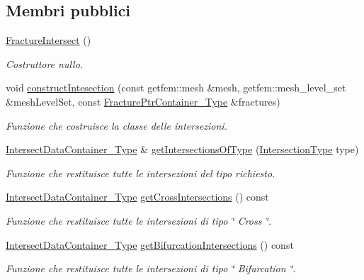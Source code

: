 \subsection*{Membri pubblici}
\begin{DoxyCompactItemize}
\item 
\hyperlink{classFractureIntersect_a2416c29105bde5cbf9032b04db47ba31}{Fracture\-Intersect} ()
\begin{DoxyCompactList}\small\item\em Costruttore nullo. \end{DoxyCompactList}\item 
void \hyperlink{classFractureIntersect_a776675c1805c35046d26a5f2bf6b1f34}{construct\-Intesection} (const getfem\-::mesh \&mesh, getfem\-::mesh\-\_\-level\-\_\-set \&mesh\-Level\-Set, const \hyperlink{FractureHandler_8h_a2f0b57e18ecf89912d7de0c87158009e}{Fracture\-Ptr\-Container\-\_\-\-Type} \&fractures)
\begin{DoxyCompactList}\small\item\em Funzione che costruisce la classe delle intersezioni. \end{DoxyCompactList}\item 
\hyperlink{IntersectData_8h_a822ec3b760dfb603e1cf0bfe3ad5636a}{Intersect\-Data\-Container\-\_\-\-Type} \& \hyperlink{classFractureIntersect_a891c902329fde6f8de70bb1bf371ccbc}{get\-Intersections\-Of\-Type} (\hyperlink{classFractureIntersect_a9a4e4a784fa4c8e359767ed543f89dc5}{Intersection\-Type} type)
\begin{DoxyCompactList}\small\item\em Funzione che restituisce tutte le intersezioni del tipo richiesto. \end{DoxyCompactList}\item 
\hyperlink{IntersectData_8h_a822ec3b760dfb603e1cf0bfe3ad5636a}{Intersect\-Data\-Container\-\_\-\-Type} \hyperlink{classFractureIntersect_a248df8f326f844e34d807234efdfd693}{get\-Cross\-Intersections} () const 
\begin{DoxyCompactList}\small\item\em Funzione che restituisce tutte le intersezioni di tipo \char`\"{} Cross \char`\"{}. \end{DoxyCompactList}\item 
\hyperlink{IntersectData_8h_a822ec3b760dfb603e1cf0bfe3ad5636a}{Intersect\-Data\-Container\-\_\-\-Type} \hyperlink{classFractureIntersect_a18ff664767b7e8ffa876b80a6100e74d}{get\-Bifurcation\-Intersections} () const 
\begin{DoxyCompactList}\small\item\em Funzione che restituisce tutte le intersezioni di tipo \char`\"{} Bifurcation \char`\"{}. \end{DoxyCompactList}\item 

\end{DoxyCompactItemize}
